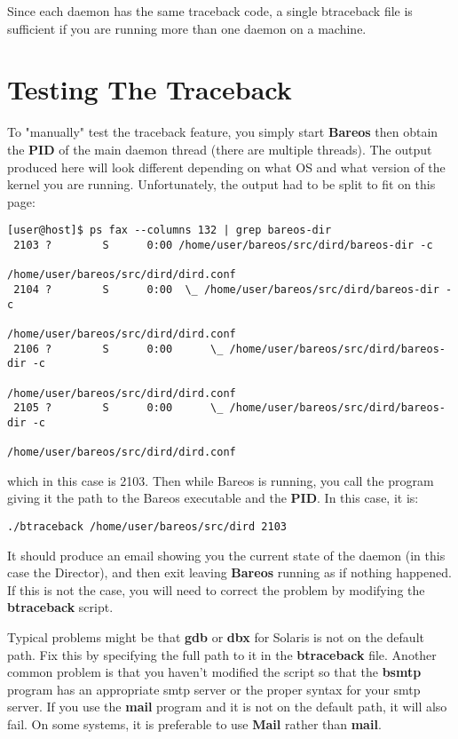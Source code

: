 Since each daemon has the same traceback code, a single btraceback file is
sufficient if you are running more than one daemon on a machine.

\section{Testing The Traceback}

To "manually" test the traceback feature, you simply start {\bf Bareos} then
obtain the {\bf PID} of the main daemon thread (there are multiple threads).
The output produced here will look different depending on what OS and what
version of the kernel you are running.
Unfortunately, the output had to be split to fit on this page:

\footnotesize
\begin{verbatim}
[user@host]$ ps fax --columns 132 | grep bareos-dir
 2103 ?        S      0:00 /home/user/bareos/src/dird/bareos-dir -c
                                       /home/user/bareos/src/dird/dird.conf
 2104 ?        S      0:00  \_ /home/user/bareos/src/dird/bareos-dir -c
                                       /home/user/bareos/src/dird/dird.conf
 2106 ?        S      0:00      \_ /home/user/bareos/src/dird/bareos-dir -c
                                       /home/user/bareos/src/dird/dird.conf
 2105 ?        S      0:00      \_ /home/user/bareos/src/dird/bareos-dir -c
                                       /home/user/bareos/src/dird/dird.conf
\end{verbatim}
\normalsize

which in this case is 2103. Then while Bareos is running, you call the program
giving it the path to the Bareos executable and the {\bf PID}. In this case,
it is:

\footnotesize
\begin{verbatim}
./btraceback /home/user/bareos/src/dird 2103
\end{verbatim}
\normalsize

It should produce an email showing you the current state of the daemon (in
this case the Director), and then exit leaving {\bf Bareos} running as if
nothing happened. If this is not the case, you will need to correct the
problem by modifying the {\bf btraceback} script.

Typical problems might be that {\bf gdb} or {\bf dbx} for Solaris is not on
the default path.  Fix this by specifying the full path to it in the {\bf
btraceback} file.  Another common problem is that you haven't modified the
script so that the {\bf bsmtp} program has an appropriate smtp server or
the proper syntax for your smtp server.  If you use the {\bf mail} program
and it is not on the default path, it will also fail.  On some systems, it
is preferable to use {\bf Mail} rather than {\bf mail}.

